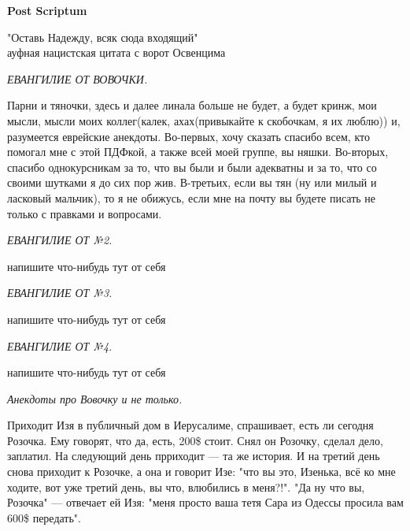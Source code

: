 \newpage
\begin{center}
    \textbf{Post Scriptum}
\end{center}
\begin{flushright}
    "Оставь Надежду, всяк сюда входящий"\\
    ауфная нацистская цитата с ворот Освенцима 
\end{flushright}

\begin{center}
    \textit{ЕВАНГИЛИЕ ОТ ВОВОЧКИ.}
\end{center}

Парни и тяночки, здесь и далее линала больше не будет, а будет кринж, мои мысли, мысли моих коллег(калек, ахах(привыкайте к скобочкам, я их люблю)) и, разумеется еврейские анекдоты. Во-первых, хочу сказать спасибо всем, кто помогал мне с этой ПДФкой, а также всей моей группе, вы няшки. Во-вторых, спасибо однокурсникам за то, что вы были и были адекватны и за то, что со своими шутками я до сих пор жив. В-третьих, если вы тян (ну или милый и ласковый мальчик), то я не обижусь, если мне на почту вы будете писать не только с правками и вопросами.\\

\begin{center}
    \textit{ЕВАНГИЛИЕ ОТ №2.}
\end{center}

напишите что-нибудь тут от себя

\begin{center}
    \textit{ЕВАНГИЛИЕ ОТ №3.}
\end{center}

напишите что-нибудь тут от себя

\begin{center}
    \textit{ЕВАНГИЛИЕ ОТ №4.}
\end{center}

напишите что-нибудь тут от себя\\

\begin{center}
    \textit{Анекдоты про Вовочку и не только.}
\end{center}

Приходит Изя в публичный дом в Иерусалиме, спрашивает, есть ли сегодня Розочка. Ему говорят, что да, есть, 200\$ стоит. Снял он Розочку, сделал дело, заплатил. На следующий день прриходит --- та же история. И на третий день снова приходит к Розочке, а она и говорит Изе: "что вы это, Изенька, всё ко мне ходите, вот уже третий день, вы что, влюбились в меня?!". "Да ну что вы, Розочка" --- отвечает ей Изя: "меня просто ваша тетя Сара из Одессы просила вам 600\$ передать". 
